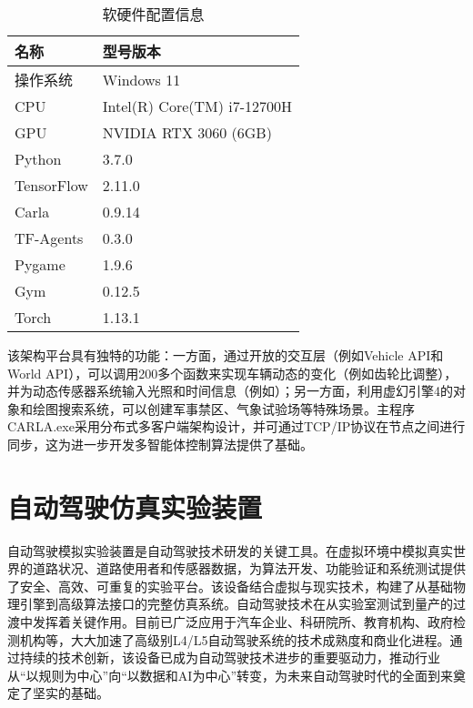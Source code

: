 \begin{table}[htbp]
	\centering
	\caption{软硬件配置信息}
	\label{tab:config}
	\begin{tabular}{ll}
		\toprule
		\textbf{名称}         & \textbf{型号版本}               \\
		\midrule
		操作系统            & Windows 11                     \\
		CPU               & Intel(R) Core(TM) i7-12700H    \\
		GPU               & NVIDIA RTX 3060 (6GB)          \\
		Python            & 3.7.0                          \\
		TensorFlow        & 2.11.0                         \\
		Carla             & 0.9.14                         \\
		TF-Agents         & 0.3.0                          \\
		Pygame            & 1.9.6                          \\
		Gym               & 0.12.5                         \\
		Torch             & 1.13.1                         \\
		\bottomrule
	\end{tabular}
\end{table}


该架构平台具有独特的功能：一方面，通过开放的交互层（例如Vehicle API和World API），可以调用200多个函数来实现车辆动态的变化（例如齿轮比调整），并为动态传感器系统输入光照和时间信息（例如）；另一方面，利用虚幻引擎4的对象和绘图搜索系统，可以创建军事禁区、气象试验场等特殊场景。主程序CARLA.exe采用分布式多客户端架构设计，并可通过TCP/IP协议在节点之间进行同步，这为进一步开发多智能体控制算法提供了基础。

\section{自动驾驶仿真实验装置}

自动驾驶模拟实验装置是自动驾驶技术研发的关键工具。在虚拟环境中模拟真实世界的道路状况、道路使用者和传感器数据，为算法开发、功能验证和系统测试提供了安全、高效、可重复的实验平台。该设备结合虚拟与现实技术，构建了从基础物理引擎到高级算法接口的完整仿真系统。自动驾驶技术在从实验室测试到量产的过渡中发挥着关键作用。目前已广泛应用于汽车企业、科研院所、教育机构、政府检测机构等，大大加速了高级别L4/L5自动驾驶系统的技术成熟度和商业化进程。通过持续的技术创新，该设备已成为自动驾驶技术进步的重要驱动力，推动行业从“以规则为中心”向“以数据和AI为中心”转变，为未来自动驾驶时代的全面到来奠定了坚实的基础。

